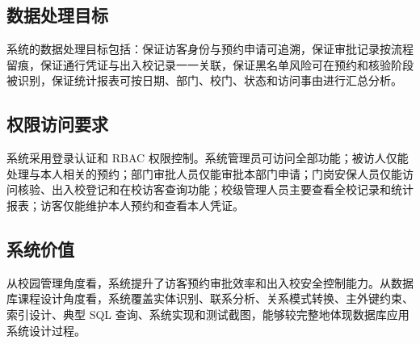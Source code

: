 \subsection{数据处理目标}
系统的数据处理目标包括：保证访客身份与预约申请可追溯，保证审批记录按流程留痕，保证通行凭证与出入校记录一一关联，保证黑名单风险可在预约和核验阶段被识别，保证统计报表可按日期、部门、校门、状态和访问事由进行汇总分析。

\subsection{权限访问要求}
系统采用登录认证和 RBAC 权限控制。系统管理员可访问全部功能；被访人仅能处理与本人相关的预约；部门审批人员仅能审批本部门申请；门岗安保人员仅能访问核验、出入校登记和在校访客查询功能；校级管理人员主要查看全校记录和统计报表；访客仅能维护本人预约和查看本人凭证。

\subsection{系统价值}
从校园管理角度看，系统提升了访客预约审批效率和出入校安全控制能力。从数据库课程设计角度看，系统覆盖实体识别、联系分析、关系模式转换、主外键约束、索引设计、典型 SQL 查询、系统实现和测试截图，能够较完整地体现数据库应用系统设计过程。
